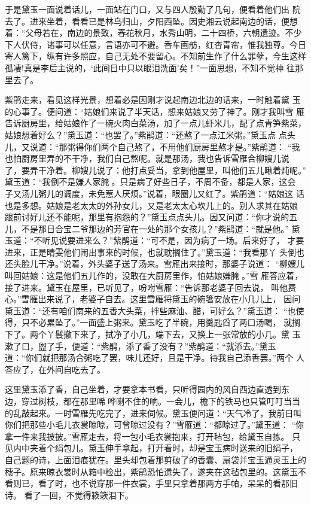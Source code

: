于是黛玉一面说着话儿，一面站在门口，又与四人殷勤了几句，便看着他们出
院去了。进来坐着，看看已是林鸟归山，夕阳西坠。因史湘云说起南边的话，便想
着：“父母若在，南边的景致，春花秋月，水秀山明，二十四桥，六朝遗迹。不少
下人伏侍，诸事可以任意，言语亦可不避。香车画舫，红杏青帘，惟我独尊。今日
寄人篱下，纵有许多照应，自己无处不要留心。不知前生作了什么罪孽，今生这样
孤凄!真是李后主说的，‘此间日中只以眼泪洗面’矣！”一面思想，不知不觉神
往那里去了。

紫鹃走来，看见这样光景，想着必是因刚才说起南边北边的话来，一时触着黛
玉的心事了。便问道：“姑娘们来说了半天话，想来姑娘又劳了神了。刚才我叫雪
雁告诉厨房里，给姑娘作了一碗火肉白菜汤，加了一点儿虾米儿，配了点青笋紫菜，
姑娘想着好么？”黛玉道：“也罢了。”紫鹃道：“还熬了一点江米粥。”黛玉点
点头儿，又说道：“那粥得你们两个自己熬了，不用他们厨房里熬才是。”紫鹃道：
“我也怕厨房里弄的不干净，我们自己熬呢。就是那汤，我也告诉雪雁合柳嫂儿说
了，要弄干净着。柳嫂儿说了：他打点妥当，拿到他屋里，叫他们五儿瞅着炖呢。”
黛玉道：“我倒不是嫌人家腌。只是病了好些日子，不周不备，都是人家，这会
子又汤儿粥儿的调度，未免惹人厌烦。”说着，眼圈儿又红了。紫鹃道：“姑娘这
话也是多想。姑娘是老太太的外孙女儿，又是老太太心坎儿上的。别人求其在姑娘
跟前讨好儿还不能呢，那里有抱怨的？”黛玉点点头儿。因又问道：“你才说的五
儿，不是那日合宝二爷那边的芳官在一处的那个女孩儿？”紫鹃道：“就是他。”
黛玉道：“不听见说要进来么？”紫鹃道：“可不是，因为病了一场。后来好了，
才要进来，正是晴雯他们闹出事来的时候，也就耽搁住了。”黛玉道：“我看那丫
头倒也还头脸儿干净。”说着，外头婆子送了汤来。雪雁出来接时，那婆子说道：
“柳嫂儿叫回姑娘：这是他们五儿作的，没敢在大厨房里作，怕姑娘嫌腌。”雪
雁答应着，接了进来。黛玉在屋里，已听见了，吩咐雪雁：“告诉那老婆子回去说，
叫他费心。”雪雁出来说了，老婆子自去。这里雪雁将黛玉的碗箸安放在小几儿上，
因问黛玉道：“还有咱们南来的五香大头菜，拌些麻油、醋，可好么？”黛玉道：
“也使得，只不必累坠了。”一面盛上粥来。黛玉吃了半碗，用羹匙舀了两口汤喝，
就搁下了。两个丫鬟撤下来了，拭净了小几，端下去，又换上一张常放的小几。黛
玉漱了口，盥了手，便道：“紫鹃，添了香了没有？”紫鹃道：“就添去。”黛玉
道：“你们就把那汤合粥吃了罢，味儿还好，且是干净。待我自己添香罢。”两个
人答应了，在外间自吃去了。

这里黛玉添了香，自己坐着，才要拿本书看，只听得园内的风自西边直透到东
边，穿过树枝，都在那里唏哗喇不住的响。一会儿，檐下的铁马也只管叮叮当当
的乱敲起来。一时雪雁先吃完了，进来伺候。黛玉便问道：“天气冷了，我前日叫
你们把那些小毛儿衣裳晾晾，可曾晾过没有？”雪雁道：“都晾过了。”黛玉道：
“你拿一件来我披披。”雪雁走去，将一包小毛衣裳抱来，打开毡包，给黛玉自拣。
只见内中夹着个绢包儿。黛玉伸手拿起，打开看时，却是宝玉病时送来的旧绢子，
自己题的诗，上面泪痕犹在。里头却包着那剪破了的香囊、扇袋并宝玉通灵玉上的
穗子。原来晾衣裳时从箱中检出，紫鹃恐怕遗失了，遂夹在这毡包里的。这黛玉不
看则已，看了时，也不说穿那一件衣裳，手里只拿着那两方手帕，呆呆的看那旧诗。
看了一回，不觉得簌簌泪下。

